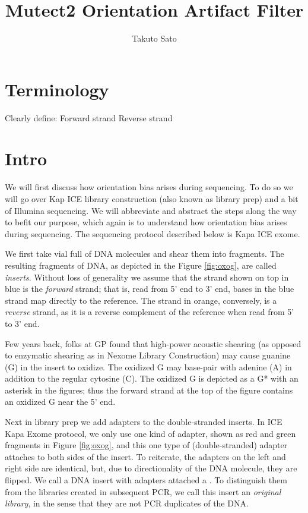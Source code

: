 \documentclass[a4paper]{article}
\title{Mutect2 Orientation Artifact Filter}
\author{Takuto Sato}
\begin{document}
\maketitle

\section{Terminology}
Clearly define:
Forward strand
Reverse strand

\section{Intro}
We will first discuss how orientation bias arises during sequencing. To do so we will go over Kap ICE library construction (also known as library prep) and a bit of Illumina sequencing. We will abbreviate and abstract the steps along the way to befit our purpose, which again is to understand how orientation bias arises during sequencing. The sequencing protocol described below is Kapa ICE exome. 

We first take vial full of DNA molecules and shear them into fragments. The resulting fragments of DNA, as depicted in the Figure \ref{fig:oxog}, are called \textit{inserts}. Without loss of generality we assume that the strand shown on top in blue is the \textit{forward} strand; that is, read from 5' end to 3' end, bases in the blue strand map directly to the reference. The strand in orange, conversely, is a \textit{reverse} strand, as it is a reverse complement of the reference when read from 5' to 3' end.

Few years back, folks at GP found that high-power acoustic shearing (as opposed to enzymatic shearing as in Nexome Library Construction) may cause guanine (G) in the insert to oxidize. The oxidized G may base-pair with adenine (A) in addition to the regular cytosine (C). The oxidized G is depicted as a G* with an asterisk in the figures; thus the forward strand at the top of the figure contains an oxidized G near the 5' end.

Next in library prep we add adapters to the double-stranded inserts. In ICE Kapa Exome protocol, we only use one kind of adapter, shown as red and green fragments in Figure \ref{fig:oxog}, and this one type of (double-stranded) adapter attaches to both sides of the insert. To reiterate, the adapters on the left and right side are identical, but, due to directionality of the DNA molecule, they are flipped. We call a DNA insert with adapters attached a . To distinguish them from the libraries created in subsequent PCR, we call this insert an \textit{original library}, in the sense that they are not PCR duplicates of the DNA.
\end{document}
